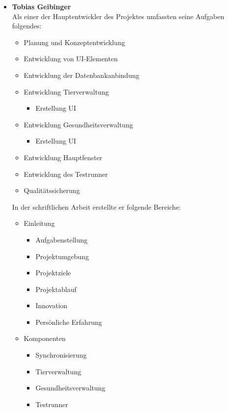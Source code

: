 \begin{itemize}

\item \textbf{Tobias Geibinger}\\
Als einer der Hauptentwickler des Projektes umfassten seine Aufgaben folgendes:
\begin{itemize}
\item Planung und Konzeptentwicklung
\item Entwicklung von UI-Elementen
\item Entwicklung der Datenbankanbindung
\item Entwicklung Tierverwaltung
\begin{itemize}
\item Erstellung UI
\end{itemize}
\item Entwicklung Gesundheitsverwaltung
\begin{itemize}
\item Erstellung UI
\end{itemize}
\item Entwicklung Hauptfenster
\item Entwicklung des Testrunner
\item Qualitätssicherung
\end{itemize}

In der schriftlichen Arbeit erstellte er folgende Bereiche:
\begin{itemize}
\item Einleitung
\begin{itemize}
\item Aufgabenstellung
\item Projektumgebung
\item Projektziele
\item Projektablauf
\item Innovation
\item Persönliche Erfahrung
\end{itemize}
\item Komponenten
\begin{itemize}
\item Synchronisierung
\item Tierverwaltung
\item Gesundheitsverwaltung
\item Testrunner
\end{itemize}
\end{itemize}
     

\end{itemize}
